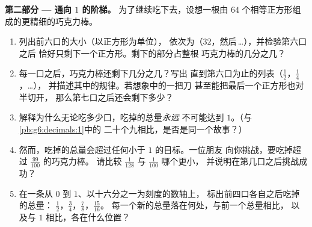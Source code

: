 \begin{problem}
\medskip
\noindent\textbf{第二部分 --- 通向 $1$ 的阶梯。}
为了继续吃下去，设想一根由 $64$ 个相等正方形组成的更精细的巧克力棒。
\begin{enumerate}[resume]
  \item 列出前六口的大小（以正方形为单位），
        依次为（$32$，然后\,\dots），并检验第六口之后
        恰好只剩下一个正方形。剩下的部分占整根
        巧克力棒的几分之几？
  \item 每一口之后，巧克力棒还剩下几分之几？写出
        直到第六口为止的列表（$\frac12$，$\frac14$，\dots），
        并描述其中的规律。若想象中的一把刀
        甚至能把最后一个正方形也对半切开，
        那么第七口之后还会剩下多少？
  \item 解释为什么无论吃多少口，吃掉的总量\emph{永远}
        不可能达到 $1$。（与\cref{pb:g6:decimals:1}中的
        二十个九相比，是否是同一个故事？）
  \item 然而，吃掉的总量会超过任何小于 $1$ 的目标。一位朋友
        向你挑战，要吃掉超过 $\frac{99}{100}$ 的巧克力棒。
        请比较 $\frac{1}{128}$ 与
        $\frac{1}{100}$ 哪个更小，
        并说明在第几口之后挑战成功？
  \item 在一条从 $0$ 到 $1$、以十六分之一为刻度的数轴上，
        标出前四口各自之后吃掉的总量：
        $\frac12$，$\frac34$，$\frac78$，$\frac{15}{16}$。
        每一个新的总量落在何处，与前一个总量相比，
        以及与 $1$ 相比，各在什么位置？
\end{enumerate}


\end{problem}
